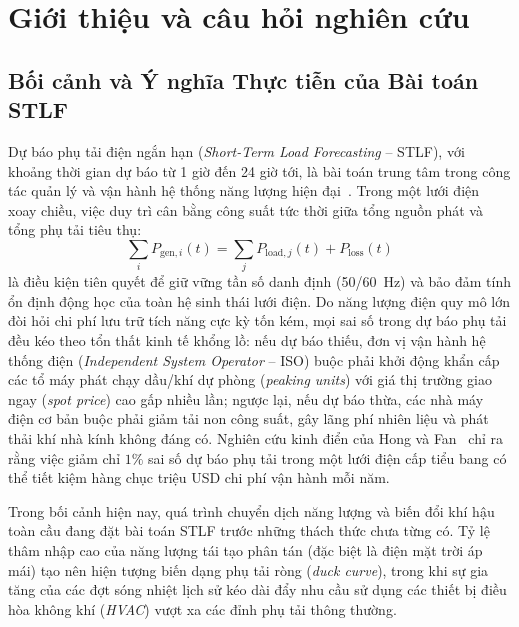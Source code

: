 \section{Giới thiệu và câu hỏi nghiên cứu}
\label{sec:introduction_and_rq}

\subsection{Bối cảnh và Ý nghĩa Thực tiễn của Bài toán STLF}
Dự báo phụ tải điện ngắn hạn (\textit{Short-Term Load Forecasting} -- STLF), với khoảng thời gian dự báo từ 1 giờ đến 24 giờ tới, là bài toán trung tâm trong công tác quản lý và vận hành hệ thống năng lượng hiện đại~\cite{hong2016probabilistic}. Trong một lưới điện xoay chiều, việc duy trì cân bằng công suất tức thời giữa tổng nguồn phát và tổng phụ tải tiêu thụ:
\begin{equation}
    \sum_{i} P_{\text{gen}, i}(t) = \sum_{j} P_{\text{load}, j}(t) + P_{\text{loss}}(t)
\end{equation}
là điều kiện tiên quyết để giữ vững tần số danh định (50/60~Hz) và bảo đảm tính ổn định động học của toàn hệ sinh thái lưới điện. Do năng lượng điện quy mô lớn đòi hỏi chi phí lưu trữ tích năng cực kỳ tốn kém, mọi sai số trong dự báo phụ tải đều kéo theo tổn thất kinh tế khổng lồ: nếu dự báo thiếu, đơn vị vận hành hệ thống điện (\textit{Independent System Operator} -- ISO) buộc phải khởi động khẩn cấp các tổ máy phát chạy dầu/khí dự phòng (\textit{peaking units}) với giá thị trường giao ngay (\textit{spot price}) cao gấp nhiều lần; ngược lại, nếu dự báo thừa, các nhà máy điện cơ bản buộc phải giảm tải non công suất, gây lãng phí nhiên liệu và phát thải khí nhà kính không đáng có. Nghiên cứu kinh điển của Hong và Fan~\cite{hong2016probabilistic} chỉ ra rằng việc giảm chỉ $1\%$ sai số dự báo phụ tải trong một lưới điện cấp tiểu bang có thể tiết kiệm hàng chục triệu USD chi phí vận hành mỗi năm.

Trong bối cảnh hiện nay, quá trình chuyển dịch năng lượng và biến đổi khí hậu toàn cầu đang đặt bài toán STLF trước những thách thức chưa từng có. Tỷ lệ thâm nhập cao của năng lượng tái tạo phân tán (đặc biệt là điện mặt trời áp mái) tạo nên hiện tượng biến dạng phụ tải ròng (\textit{duck curve}), trong khi sự gia tăng của các đợt sóng nhiệt lịch sử kéo dài đẩy nhu cầu sử dụng các thiết bị điều hòa không khí (\textit{HVAC}) vượt xa các đỉnh phụ tải thông thường.

